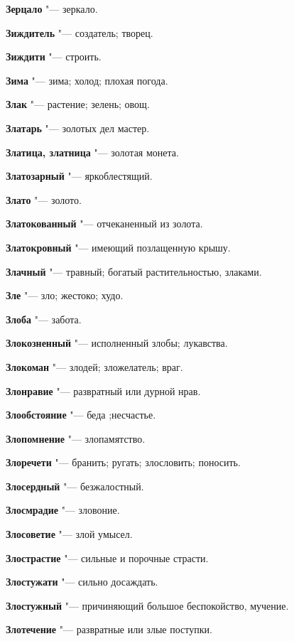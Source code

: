 \begin{mymulticols}
\noindent\textbf{Зерцало} "--- зеркало. 

\noindent\textbf{Зиждитель} "--- создатель; творец. 

\noindent\textbf{Зиждити} "--- строить. 

\noindent\textbf{Зима} "--- зима; холод; плохая погода. 

\noindent\textbf{Злак} "--- растение; зелень; овощ. 

\noindent\textbf{Златарь} "--- золотых дел мастер. 

\noindent\textbf{Златица, златница} "--- золотая монета. 

\noindent\textbf{Златозарный} "--- яркоблестящий. 

\noindent\textbf{Злато} "--- золото. 

\noindent\textbf{Златокованный} "--- отчеканенный из золота. 

\noindent\textbf{Златокровный} "--- имеющий позлащенную крышу. 

\noindent\textbf{Злачный} "--- травный; богатый растительностью, злаками. 

\noindent\textbf{Зле} "--- зло; жестоко; худо. 

\noindent\textbf{Злоба} "--- забота. 

\noindent\textbf{Злокозненный} "--- исполненный злобы; лукавства. 

\noindent\textbf{Злокоман} "--- злодей; зложелатель; враг. 

\noindent\textbf{Злонравие} "--- развратный или дурной нрав. 

\noindent\textbf{Злообстояние} "--- беда ;несчастье. 

\noindent\textbf{Злопомнение} "--- злопамятство. 

\noindent\textbf{Злоречети} "--- бранить; ругать; злословить; поносить. 

\noindent\textbf{Злосердный} "--- безжалостный. 

\noindent\textbf{Злосмрадие} "--- зловоние. 

\noindent\textbf{Злосоветие} "--- злой умысел. 

\noindent\textbf{Злострастие} "--- сильные и порочные страсти. 

\noindent\textbf{Злостужати} "--- сильно досаждать. 

\noindent\textbf{Злостужный} "--- причиняющий большое беспокойство, мучение. 

\noindent\textbf{Злотечение} "--- развратные или злые поступки. 


\end{mymulticols}
